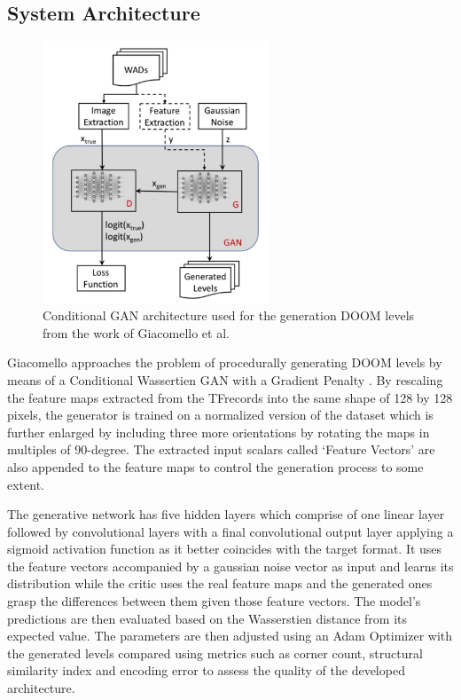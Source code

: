 \documentclass{Configuration_Files/PoliMi3i_thesis}
\begin{document}
\subsection{System Architecture}

\begin{figure}
    \includegraphics[width=0.6\textwidth]{cWGAN.jpg}
    \caption[Conditional GAN architecture from the work of Giacomello et al.]{Conditional GAN architecture used for the generation DOOM levels from the work of Giacomello et al.}
    \label{fig:cwgan}
\end{figure}

Giacomello approaches the problem of procedurally generating DOOM levels by means of a Conditional 
Wassertien GAN with a Gradient Penalty \cite{EdG18}. By rescaling the feature maps extracted from the 
TFrecords into the same shape of 128 by 128 pixels, the generator is trained on a normalized version of 
the dataset which is further enlarged by including three more orientations by rotating the maps 
in multiples of 90-degree. The extracted input scalars called ‘Feature Vectors’ are also 
appended to the feature maps to control the generation process to some extent. 

The generative network has five hidden layers which comprise of one linear layer followed by 
convolutional layers with a final convolutional output layer applying a sigmoid activation 
function as it better coincides with the target format. It uses the feature vectors 
accompanied by a gaussian noise vector as input and learns its distribution while the 
critic uses the real feature maps and the generated ones grasp the differences
between them given those feature vectors. The model’s predictions are then 
evaluated based on the Wasserstien distance from its expected value. The parameters 
are then adjusted using an Adam Optimizer with the generated levels compared 
using metrics such as corner count, structural similarity index and encoding error to 
assess the quality of the developed architecture.
\end{document}
